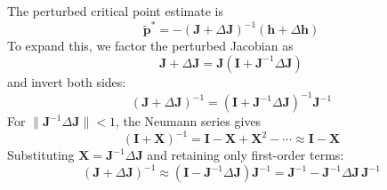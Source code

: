 \documentclass[lettersize,journal]{IEEEtran}
\begin{document}
The perturbed critical point estimate is
\begin{equation}
    \tilde{\mathbf{p}}^* = -(\mathbf{J} + \Delta\mathbf{J})^{-1}(\mathbf{h} + \Delta\mathbf{h})
    \label{eq:perturbed_pstar}
\end{equation}
To expand this, we factor the perturbed Jacobian as
\begin{equation}
    \mathbf{J} + \Delta\mathbf{J} = \mathbf{J}\!\left(\mathbf{I} + \mathbf{J}^{-1}\Delta\mathbf{J}\right)
    \label{eq:factor_J}
\end{equation}
and invert both sides:
\begin{equation}
    (\mathbf{J} + \Delta\mathbf{J})^{-1} = \left(\mathbf{I} + \mathbf{J}^{-1}\Delta\mathbf{J}\right)^{-1}\mathbf{J}^{-1}
    \label{eq:invert_factor}
\end{equation}
For $\|\mathbf{J}^{-1}\Delta\mathbf{J}\| < 1$, the Neumann series gives
\begin{equation}
    \left(\mathbf{I} + \mathbf{X}\right)^{-1} = \mathbf{I} - \mathbf{X} + \mathbf{X}^2 - \cdots \approx \mathbf{I} - \mathbf{X}
    \label{eq:neumann}
\end{equation}
Substituting $\mathbf{X} = \mathbf{J}^{-1}\Delta\mathbf{J}$ and retaining only first-order terms:
\begin{equation}
    (\mathbf{J} + \Delta\mathbf{J})^{-1} \approx \left(\mathbf{I} - \mathbf{J}^{-1}\Delta\mathbf{J}\right)\mathbf{J}^{-1} = \mathbf{J}^{-1} - \mathbf{J}^{-1}\Delta\mathbf{J}\,\mathbf{J}^{-1}
    \label{eq:first_order_inv}
\end{equation}
\end{document}
